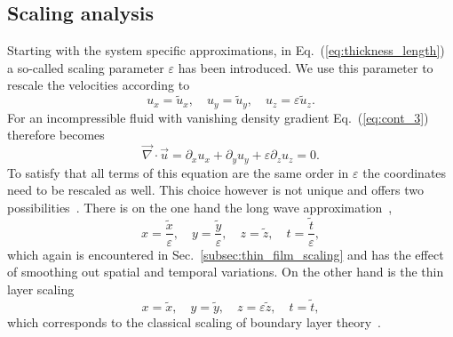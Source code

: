 \subsection{Scaling analysis}
\label{subssec:scaling_shallow water}
Starting with the system specific approximations, in Eq.~(\ref{eq:thickness_length}) a so-called scaling parameter $\varepsilon$ has been introduced. 
We use this parameter to rescale the velocities according to
\begin{equation}\label{eq:vel_scaling}
    u_x = \tilde{u}_x,\quad u_y = \tilde{u}_y,\quad u_z = \varepsilon\tilde{u}_z.
\end{equation}
For an incompressible fluid with vanishing density gradient Eq.~(\ref{eq:cont_3}) therefore becomes
\begin{equation}\label{eq:cont_nondim}
    \vec{\nabla}\cdot\vec{u} = \partial_x u_x + \partial_y u_y + \varepsilon\partial_z u_z = 0.
\end{equation}
To satisfy that all terms of this equation are the same order in $\varepsilon$ the coordinates need to be rescaled as well. 
This choice however is not unique and offers two possibilities~\cite{jamesNewFrictionModel2019}.
There is on the one hand the long wave approximation~\cite{oronLongscaleEvolutionThin1997},
\begin{equation}\label{eq:long_wave_scaling}
    x = \frac{\tilde{x}}{\varepsilon},\quad y = \frac{\tilde{y}}{\varepsilon},\quad z = \tilde{z},\quad t = \frac{\tilde{t}}{\varepsilon},
\end{equation}
which again is encountered in Sec.~\ref{subsec:thin_film_scaling} and has the effect of smoothing out spatial and temporal variations.
On the other hand is the thin layer scaling
\begin{equation}\label{eq:scaling_thin_layer}
    x = \tilde{x},\quad y = \tilde{y},\quad z = \varepsilon\tilde{z},\quad t = \tilde{t},
\end{equation}
which corresponds to the classical scaling of boundary layer theory~\cite{milne-thomsonTheoreticalHydrodynamics1996}.

